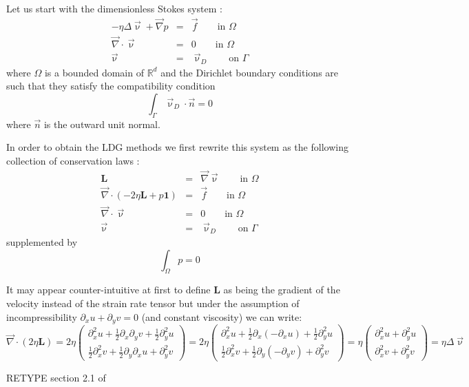 Let us start with the dimensionless Stokes system \cite{coks02}:
\begin{eqnarray}
- \eta \Delta \vec\upnu + \vec\nabla p &=& \vec{f}  \qquad \textrm{in } \Omega\\
\vec\nabla\cdot\vec\upnu &=& 0 \qquad \textrm{in } \Omega\\
\vec{\upnu} &=& \vec{\upnu}_D \qquad \textrm{on } \Gamma
\end{eqnarray}
where $\Omega$ is a bounded domain of $\mathbb{R}^d$ and the Dirichlet boundary conditions are
such that they satisfy the compatibility condition
\[
\int_\Gamma \vec\upnu_D \cdot \vec{n} =0
\]
where $\vec{n}$ is the outward unit normal. 

In order to obtain the LDG methods we first rewrite this system as the following collection of conservation 
laws \cite{coks02}:
\begin{eqnarray}
{\bm L} &=& \vec\nabla \vec\upnu  \qquad \textrm{in } \Omega\\
\vec\nabla\cdot (-2\eta {\bm L} + p {\bm 1}) &=& \vec{f}  \qquad \textrm{in } \Omega\\
\vec\nabla\cdot\vec\upnu &=& 0 \qquad \textrm{in } \Omega\\
\vec{\upnu} &=& \vec{\upnu}_D \qquad \textrm{on } \Gamma
\end{eqnarray}
supplemented by
\[
\int_\Omega p =0
\]

\begin{remark}
It may appear counter-intuitive at first to define ${\bm L}$ as being the gradient
of the velocity instead of the strain rate tensor but under the assumption
of incompressibility $\partial_x u + \partial_y v =0$ (and constant viscosity) we can write:
\[
\vec\nabla\cdot (2 \eta {\bm L}) = 
2\eta
\left(
\begin{array}{c}
\partial_x^2 u + \frac{1}{2}\partial_x\partial_y v + \frac{1}{2}\partial_y^2 u \\
\frac{1}{2}\partial_x^2 v + \frac{1}{2} \partial_y\partial_x u + \partial_y^2 v
\end{array}
\right)
=
2\eta
\left(
\begin{array}{c}
\partial_x^2 u + \frac{1}{2}\partial_x(-\partial_x u) + \frac{1}{2}\partial_y^2 u \\
\frac{1}{2}\partial_x^2 v + \frac{1}{2} \partial_y(-\partial_y v) + \partial_y^2 v
\end{array}
\right)
=
\eta
\left(
\begin{array}{c}
\partial_x^2 u + \partial_y^2 u \\
\partial_x^2 v + \partial_y^2 v
\end{array}
\right)
=
\eta \Delta \vec\upnu
\]
\end{remark}


RETYPE section 2.1 of \cite{coks02}

